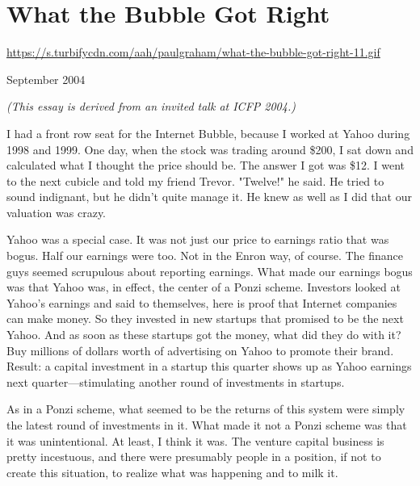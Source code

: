 \chapter{What the Bubble Got Right}


            
              
                \href{https://s.turbifycdn.com/aah/paulgraham/what-the-bubble-got-right-11.gif}{https://s.turbifycdn.com/aah/paulgraham/what-the-bubble-got-right-11.gif}



September 2004

\emph{(This essay is derived from an invited talk at ICFP
                    2004.)}

I had a front row seat for the Internet Bubble,
                  because I worked at Yahoo during 1998 and 1999. One day, when
                  the stock was trading around \$200, I sat down and calculated
                  what I thought the price should be. The answer I got was \$12.
                  I went to the next cubicle and told my friend Trevor.
                  "Twelve!" he said. He tried to sound indignant, but he didn't
                  quite manage it. He knew as well as I did that our valuation
                  was crazy.

Yahoo was a special case. It was not
                  just our price to earnings ratio that was bogus. Half our
                  earnings were too. Not in the Enron way, of course. The
                  finance guys seemed scrupulous about reporting earnings. What
                  made our earnings bogus was that Yahoo was, in effect, the
                  center of a Ponzi scheme. Investors looked at Yahoo's earnings
                  and said to themselves, here is proof that Internet companies
                  can make money. So they invested in new startups that promised
                  to be the next Yahoo. And as soon as these startups got the
                  money, what did they do with it? Buy millions of dollars worth
                  of advertising on Yahoo to promote their brand. Result: a
                  capital investment in a startup this quarter shows up as Yahoo
                  earnings next quarter---stimulating another round of
                  investments in startups.

As in a Ponzi scheme, what
                  seemed to be the returns of this system were simply the latest
                  round of investments in it. What made it not a Ponzi scheme
                  was that it was unintentional. At least, I think it was. The
                  venture capital business is pretty incestuous, and there were
                  presumably people in a position, if not to create this
                  situation, to realize what was happening and to milk it.

